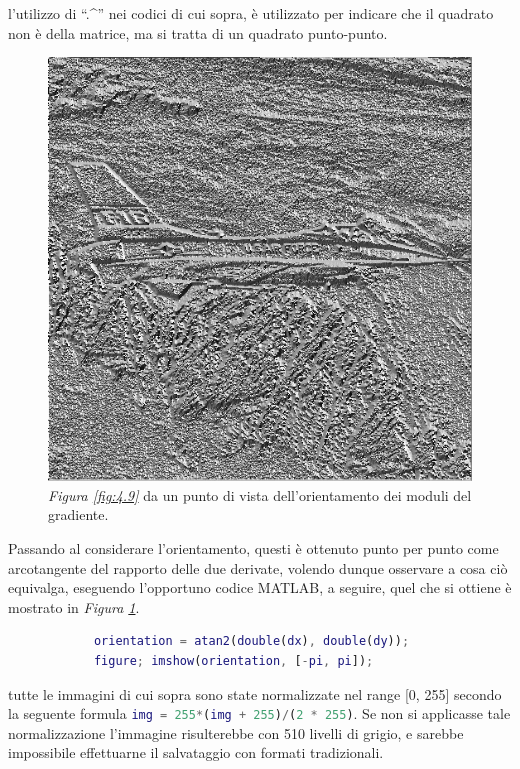 \documentclass{subfiles}
\begin{document}
\begin{Note*}
    l'utilizzo di ``.\textasciicircum '' nei codici di cui sopra, è utilizzato per indicare che il quadrato non è della matrice, ma si tratta di un quadrato punto-punto.
\end{Note*}
\begin{figure}
    \centering
    \includegraphics[scale = 0.325]{../Images/Airplane/OrientationAirplane.png}
    \caption{\emph{Figura \ref{fig:4.9}} da un punto di vista dell'orientamento dei moduli del gradiente.}
    \label{fig:4.11}
\end{figure}
Passando al considerare l'orientamento, questi è ottenuto punto per punto come arcotangente del rapporto delle due derivate,
volendo dunque osservare a cosa ciò equivalga, eseguendo l'opportuno codice MATLAB, a seguire, quel che si ottiene è mostrato in \emph{Figura \ref{fig:4.11}}.
\begin{center}
    \begin{lstlisting}[language = MATLAB]
            % dx e dy sono le immagine sin ora calcolate
            orientation = atan2(double(dx), double(dy));
            figure; imshow(orientation, [-pi, pi]);
        \end{lstlisting}
\end{center}

\begin{Note*}
    tutte le immagini di cui sopra sono state normalizzate nel range [0, 255] secondo la seguente formula \lstinline[language = MATLAB]{img = 255*(img + 255)/(2 * 255)}.
    Se non si applicasse tale normalizzazione l'immagine risulterebbe con 510 livelli di grigio, e sarebbe impossibile effettuarne il salvataggio con formati tradizionali.
\end{Note*}
\end{document}
